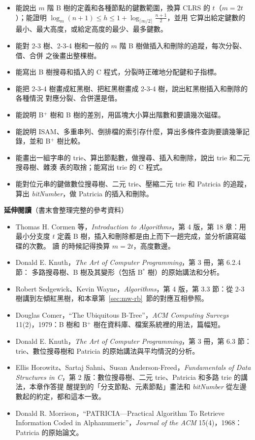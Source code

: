 \begin{itemize}
\item 能說出 $m$ 階 B 樹的定義和各種節點的鍵數範圍，換算 CLRS 的 $t$（$m = 2t$）；能證明 $\log_m(n+1) \le h \le 1 + \log_{\lceil m/2 \rceil}\frac{n+1}{2}$，並用
它算出給定鍵數的最小、最大高度，或給定高度的最少、最多鍵數。
\item 能對 2-3 樹、2-3-4 樹和一般的 $m$ 階 B 樹做插入和刪除的追蹤，每次分裂、借、合併
之後畫出整棵樹。
\item 能寫出 B 樹搜尋和插入的 C 程式，分裂時正確地分配鍵和子指標。
\item 能把 2-3-4 樹畫成紅黑樹、把紅黑樹畫成 2-3-4 樹，說出紅黑樹插入和刪除的各種情況
對應分裂、合併還是借。
\item 能說明 B$^{+}$ 樹和 B 樹的差別，用區塊大小算出階數和要讀幾次磁碟。
\item 能說明 ISAM、多重串列、倒排檔的索引存什麼，算出多條件查詢要讀幾筆記錄，並和
B$^{+}$ 樹比較。
\item 能畫出一組字串的 trie、算出節點數，做搜尋、插入和刪除，說出 trie 和二元搜尋樹、雜湊
表的取捨；能寫出 trie 的 C 程式。
\item 能對位元串的鍵做數位搜尋樹、二元 trie、壓縮二元 trie 和 Patricia 的追蹤，算出
\textit{bitNumber}，做 Patricia 的插入和刪除。
\end{itemize}

\textbf{延伸閱讀}（書末會整理完整的參考資料）

\begin{itemize}
\item Thomas H. Cormen 等，\textit{Introduction to Algorithms}，第 4 版，第 18 章：用
最小分支度 $t$ 定義 B 樹，插入和刪除都是由上而下一趟完成，並分析讀寫磁碟的次數。 讀
的時候記得換算 $m = 2t$，高度數邊。
\item Donald E. Knuth，\textit{The Art of Computer Programming}，第 3 冊，第 6.2.4 節：
多路搜尋樹、B 樹及其變形（包括 B$^{*}$ 樹）的原始講法和分析。
\item Robert Sedgewick、Kevin Wayne，\textit{Algorithms}，第 4 版，第 3.3 節：從 2-3
樹講到左傾紅黑樹，和本章第~\ref{sec:mw-rb}~節的對應互相參照。
\item Douglas Comer，``The Ubiquitous B-Tree''，\textit{ACM Computing Surveys}
11(2)，1979：B 樹和 B$^{+}$ 樹在資料庫、檔案系統裡的用法，篇幅短。
\item Donald E. Knuth，\textit{The Art of Computer Programming}，第 3 冊，第 6.3 節：
trie、數位搜尋樹和 Patricia 的原始講法與平均情況的分析。
\item Ellis Horowitz、Sartaj Sahni、Susan Anderson-Freed，\textit{Fundamentals of Data
Structures in C}，第 2 版：數位搜尋樹、二元 trie、Patricia 和多路 trie 的講法，本章作答提
醒提到的「分支節點、元素節點」畫法和 \textit{bitNumber} 從左邊數起的約定，都和這本一致。
\item Donald R. Morrison，``PATRICIA---Practical Algorithm To Retrieve Information Coded
in Alphanumeric''，\textit{Journal of the ACM} 15(4)，1968：Patricia 的原始論文。
\end{itemize}

